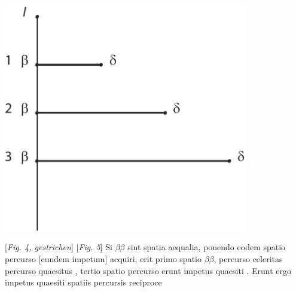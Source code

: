 \begin{minipage}[t]{0.47\textwidth}
\includegraphics[trim = 0mm -5mm 0mm 0mm, clip, width=0.8\textwidth]{images/lh0350911_007v-d2.pdf}
\end{minipage}
\hspace*{22mm} [\textit{Fig. 4, gestrichen}]\hspace{54mm} [\textit{Fig. 5}]
\pend
\vspace{1em}
\count{}
\count{}
\pstart
 Si $\displaystyle \beta\beta$ sint spatia aequalia,
ponendo eodem spatio percurso\protect{}
[eundem impetum\protect{}]
acquiri, erit primo spatio $\displaystyle \beta\beta$,
percurso celeritas
percurso  quaesitus , tertio spatio percurso  erunt impetus quaesiti . Erunt ergo impetus quaesiti spatiis percursis reciproce
